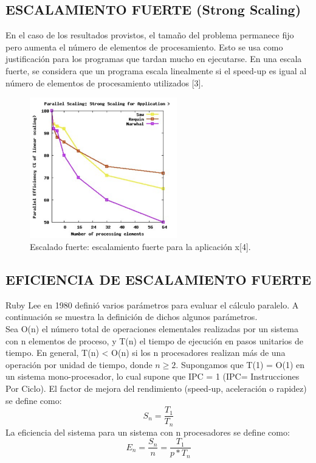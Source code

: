 \documentclass[conference]{IEEEtran}
\begin{document}
\subsection{ESCALAMIENTO FUERTE (Strong Scaling) }
En el caso de los resultados provistos, el tamaño del problema permanece fijo pero aumenta el número de elementos de procesamiento. Esto se usa como justificación para los programas que tardan mucho en ejecutarse. En una escala fuerte, se considera que un programa escala linealmente si el speed-up es igual al número de elementos de procesamiento utilizados [3].

\begin{figure}[h]
    \centering
    \includegraphics[width =6.4cm]{Images/bibliografia.png}
    \caption{Escalado fuerte: escalamiento fuerte para la aplicación x[4].}
    \label{fig:my_label}
\end{figure}

\subsection{EFICIENCIA DE ESCALAMIENTO FUERTE\\}
 Ruby Lee en 1980 definió varios parámetros para evaluar el cálculo paralelo. A continuación se muestra la definición de dichos algunos  parámetros.\\

Sea O(n) el número total de operaciones elementales realizadas
por un sistema con n elementos de proceso, y T(n) el tiempo de ejecución en pasos unitarios de tiempo. En general, T(n) < O(n) si los n procesadores realizan más de una operación por unidad de tiempo, donde $ n \geq 2 $. Supongamos que T(1) = O(1) en un sistema mono-procesador, lo cual supone que IPC = 1 (IPC= Instrucciones Por Ciclo). El factor de mejora del rendimiento (speed-up, aceleración o rapidez) se define como:
\begin{equation}
  S_{n}= \frac{T_{1}}{T_{n}}
\end{equation}
La eficiencia del sistema para un sistema con n procesadores se define como:
\begin{equation}
    E_{n}= \frac{S_{n}}{n} = \frac{T_{1}}{p*T_{n}}
\end{equation}
\end{document}
